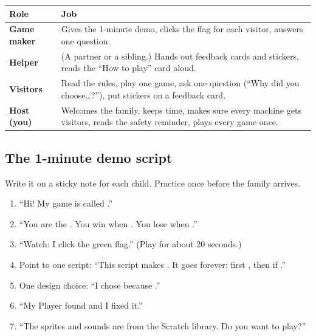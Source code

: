 \documentclass[track=junior,level=2,teacher]{kidscode}
\begin{document}
\begin{center}\small\renewcommand{\arraystretch}{1.3}
\begin{tabularx}{\linewidth}{@{}>{\bfseries}p{3.0cm}X@{}}
\toprule
Role & Job\\
\midrule
Game maker & Gives the 1-minute demo, clicks the flag for each visitor, answers one question.\\
Helper & (A partner or a sibling.) Hands out feedback cards and stickers, reads the \enquote{How to play} card aloud.\\
Visitors & Read the rules, play one game, ask one question (\enquote{Why did you choose\ldots?}), put stickers on a feedback card.\\
Host (you) & Welcomes the family, keeps time, makes sure every machine gets visitors, reads the safety reminder, plays every game once.\\
\bottomrule
\end{tabularx}
\end{center}

\subsection{The 1-minute demo script}
Write it on a sticky note for each child. Practice once before the family arrives.
\begin{enumerate}[itemsep=2pt]
  \item \enquote{Hi! My game is called \underline{\hspace{3cm}}.}
  \item \enquote{You are the \underline{\hspace{2.5cm}}. You win when \underline{\hspace{3cm}}. You lose when \underline{\hspace{3cm}}.}
  \item \enquote{Watch: I click the green flag.} (Play for about 20 seconds.)
  \item Point to one script: \enquote{This script makes \underline{\hspace{3cm}}. It goes forever: first \underline{\hspace{2.5cm}}, then if \underline{\hspace{2.5cm}}.}
  \item One design choice: \enquote{I chose \underline{\hspace{3cm}} because \underline{\hspace{3.5cm}}.}
  \item \enquote{My Player found \underline{\hspace{3cm}} and I fixed it.}
  \item \enquote{The sprites and sounds are from the Scratch library. Do you want to play?}
\end{enumerate}
\end{document}
